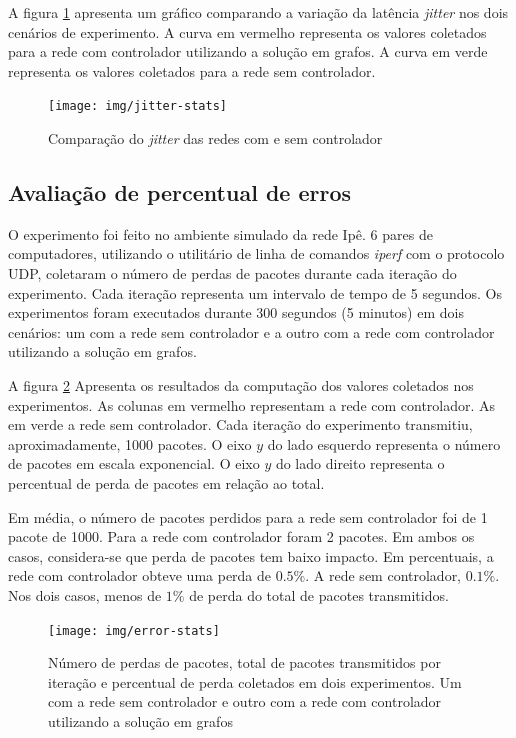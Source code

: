 A figura \ref{fig:jitter-stats} apresenta um gráfico comparando a variação da
latência \emph{jitter} nos dois cenários de experimento.
A curva em vermelho representa os valores coletados para a rede com controlador
utilizando a solução em grafos.
A curva em verde representa os valores coletados para a rede sem controlador.

\break

\begin{figure}[!htb]
    \centering
    \label{fig:jitter-stats}
    \texttt{[image: img/jitter-stats]}
    \caption{Comparação do \emph{jitter} das redes com e sem controlador}
\end{figure}


\subsection{Avaliação de percentual de erros}

O experimento foi feito no ambiente simulado da rede Ipê.
6 pares de computadores, utilizando o utilitário de linha de comandos
\emph{iperf} com o protocolo UDP, coletaram o número de perdas de pacotes
durante cada iteração do experimento.
Cada iteração representa um intervalo de tempo de 5 segundos.
Os experimentos foram executados durante 300 segundos (5 minutos) em dois
cenários: um com a rede sem controlador e a outro com a rede com controlador
utilizando a solução em grafos.

A figura \ref{fig:error-stats} Apresenta os resultados da computação dos
valores coletados nos experimentos.
As colunas em vermelho representam a rede com controlador.
As em verde a rede sem controlador.
Cada iteração do experimento transmitiu, aproximadamente, 1000 pacotes.
O eixo $y$ do lado esquerdo representa o número de pacotes em escala
exponencial.
O eixo $y$ do lado direito representa o percentual de perda de pacotes
em relação ao total.

Em média, o número de pacotes perdidos para a rede sem controlador foi de
1 pacote de 1000.
Para a rede com controlador foram 2 pacotes.
Em ambos os casos, considera-se que perda de pacotes tem baixo impacto.
Em percentuais, a rede com controlador obteve uma perda de $0.5 \%$.
A rede sem controlador, $0.1 \%$.
Nos dois casos, menos de $1 \%$ de perda do total de pacotes transmitidos.

\begin{figure}[!htb]
    \centering
    \label{fig:error-stats}
    \texttt{[image: img/error-stats]}
    \caption{Número de perdas de pacotes, total de pacotes transmitidos por
    iteração e percentual de perda coletados em dois experimentos. Um com a
    rede sem controlador e outro com a rede com controlador utilizando a
    solução em grafos}
\end{figure}

